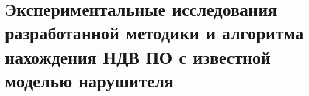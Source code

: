 \chapter{Экспериментальные исследования разработанной методики и алгоритма нахождения НДВ ПО с известной моделью нарушителя}\label{ch:ch4}
